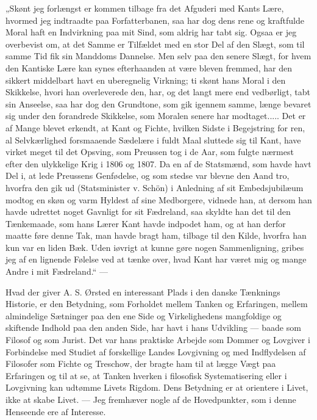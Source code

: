 \documentclass[12pt,a4paper,openany]{book}
\newcommand{\opage}[1]{\marginnote{\footnotesize\textit{[#1]}}}
\begin{document}
„Skønt jeg forlængst er kommen tilbage fra det Afguderi med Kants Lære, hvormed
jeg indtraadte paa Forfatterbanen, saa har dog dens rene og kraftfulde Moral
haft en Indvirkning paa mit Sind, som aldrig har tabt sig. Ogsaa er jeg
overbevist om, at det Samme er Tilfældet med en stor Del af den Slægt, som til
samme Tid fik sin Manddoms Dannelse. Men selv paa den senere Slægt, for hvem
den Kantiske Lære kan synes efterhaanden at være bleven fremmed, har den
sikkert middelbart havt en uberegnelig Virkning; ti skønt hans Moral i den
Skikkelse, hvori han overleverede den, har, og det langt mere end vedbørligt,
tabt sin Anseelse, saa har dog den Grundtone, som gik igennem samme, længe
bevaret sig under den forandrede Skikkelse, som Moralen senere har
modtaget..... Det er af Mange blevet erkendt, at Kant og Fichte, hvilken Sidste
i Begejstring for ren, al Selvkærlighed forsmaaende Sædelære i fuldt Maal
sluttede sig til Kant, have virket meget til det Opsving, som Preussen tog i de
Aar, som fulgte nærmest efter den ulykkelige Krig i 1806 og 1807. Da en af de
Statsmænd, som havde havt Del i, at lede Preussens Genfødelse, og som stedse
var blevne den Aand tro, hvorfra den gik ud (Statsminister v. Schön) i
Anledning af sit Embedsjubilæum modtog en skøn og varm Hyldest af sine
Medborgere, vidnede han, at dersom han havde udrettet noget Gavnligt for sit
Fædreland, saa skyldte han det til den Tænkemaade, som hans Lærer Kant havde
indpodet ham,
\setcounter{footnote}{0}%
\opage{75}og at han derfor maatte føre denne Tak, man havde bragt ham, tilbage
til den Kilde, hvorfra han kun var en liden Bæk. Uden iøvrigt at kunne gøre
nogen Sammenligning, gribes jeg af en lignende Følelse ved at tænke over, hvad
Kant har været mig og mange Andre i mit Fædreland.“ ---

Hvad der giver A. S. Ørsted en interessant Plads i den danske Tænknings
Historie, er den Betydning, som Forholdet mellem Tanken og Erfaringen, mellem
almindelige Sætninger paa den ene Side og Virkelighedens mangfoldige og
skiftende Indhold paa den anden Side, har havt i hans Udvikling --- baade som
Filosof og som Jurist. Det var hans praktiske Arbejde som Dommer og Lovgiver i
Forbindelse med Studiet af forskellige Landes Lovgivning og med Indflydelsen af
Filosofer som Fichte og Treschow, der bragte ham til at lægge Vægt paa
Erfaringen og til at se, at Tanken hverken i filosofisk Systematisering eller i
Lovgivning kan udtømme Livets Rigdom. Dens Betydning er at orientere i Livet,
ikke at skabe Livet. --- Jeg fremhæver nogle af de Hovedpunkter, som i denne
Henseende ere af Interesse.
\end{document}
